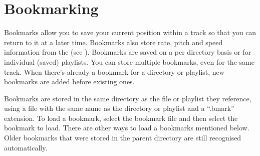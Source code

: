 \section{\label{ref:Bookmarkconfigactual}Bookmarking}
  Bookmarks allow you to save your current position within a track so that 
  you can return to it at a later time. Bookmarks also store rate, pitch
  and speed information from the  (see
  ). Bookmarks are saved on a per directory
  basis or for individual (saved) playlists. You can store multiple bookmarks,
  even for the same track. When there's already a bookmark for a directory or
  playlist, new bookmarks are added before existing ones.

  Bookmarks are stored in the same directory as the file or playlist they
  reference, using a file with the same name as the directory or playlist and a ``.bmark''
  extension. To load a bookmark, select the bookmark file and then select
  the bookmark to load. There are other ways to load a bookmarks mentioned
  below.
  Older bookmarks that were stored in the parent directory are still
  recognised automatically.


